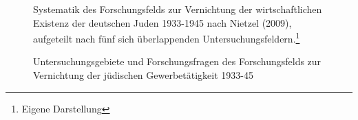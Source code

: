 \onehalfspacing

\begin{figure}[h]
\centering
{}
\caption{Systematik des Forschungsfelds zur Vernichtung der wirtschaftlichen Existenz der deutschen Juden 1933-1945 nach Nietzel (2009), aufgeteilt nach fünf sich überlappenden Untersuchungsfeldern.\protect\footnote{Eigene Darstellung}}
\label{fig:x cubed graph}
\end{figure}

\begin{figure}[h]
\centering
{}
\caption{Untersuchungsgebiete und Forschungsfragen des Forschungsfelds zur Vernichtung der jüdischen Gewerbetätigkeit 1933-45}
\label{fig:x cubed graph}
\end{figure}